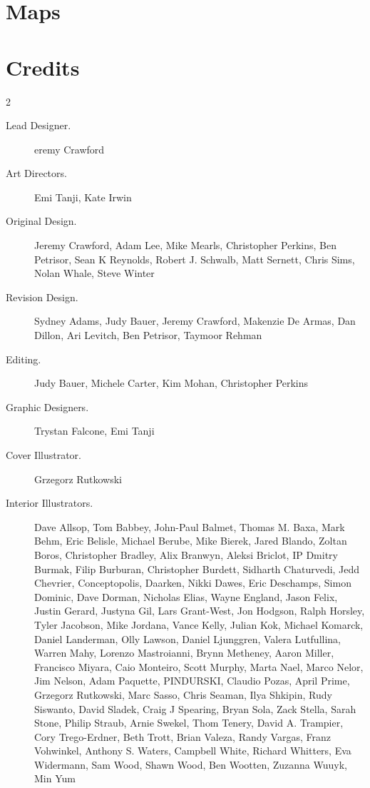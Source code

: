 \documentclass[10pt,a4paper,twoside,bg=print,twocolumn,openany,nodeprecatedcode]{dndbook}
\begin{document}
\chapter{Maps}
\chapter{Credits}

\begin{description}
\begin{multicols}{2}

\begin{description}
\item[Lead Designer.]
eremy Crawford


\item[Art Directors.]
Emi Tanji, Kate Irwin

\item[Original Design.]
Jeremy Crawford, Adam Lee, Mike Mearls, Christopher Perkins, Ben Petrisor, Sean K Reynolds, Robert J. Schwalb, Matt Sernett, Chris Sims, Nolan Whale, Steve Winter

\item[Revision Design.]
Sydney Adams, Judy Bauer, Jeremy Crawford, Makenzie De Armas, Dan Dillon, Ari Levitch, Ben Petrisor, Taymoor Rehman

\item[Editing.]
Judy Bauer, Michele Carter, Kim Mohan, Christopher Perkins

\item[Graphic Designers.]
Trystan Falcone, Emi Tanji

\item[Cover Illustrator.]
Grzegorz Rutkowski

\item[Interior Illustrators.]
Dave Allsop, Tom Babbey, John-Paul Balmet, Thomas M. Baxa, Mark Behm, Eric Belisle, Michael Berube, Mike Bierek, Jared Blando, Zoltan Boros, Christopher Bradley, Alix Branwyn, Aleksi Briclot, IP Dmitry Burmak, Filip Burburan, Christopher Burdett, Sidharth Chaturvedi, Jedd Chevrier, Conceptopolis, Daarken, Nikki Dawes, Eric Deschamps, Simon Dominic, Dave Dorman, Nicholas Elias, Wayne England, Jason Felix, Justin Gerard, Justyna Gil, Lars Grant-West, Jon Hodgson, Ralph Horsley, Tyler Jacobson, Mike Jordana, Vance Kelly, Julian Kok, Michael Komarck, Daniel Landerman, Olly Lawson, Daniel Ljunggren, Valera Lutfullina, Warren Mahy, Lorenzo Mastroianni, Brynn Metheney, Aaron Miller, Francisco Miyara, Caio Monteiro, Scott Murphy, Marta Nael, Marco Nelor, Jim Nelson, Adam Paquette, PINDURSKI, Claudio Pozas, April Prime, Grzegorz Rutkowski, Marc Sasso, Chris Seaman, Ilya Shkipin, Rudy Siswanto, David Sladek, Craig J Spearing, Bryan Sola, Zack Stella, Sarah Stone, Philip Straub, Arnie Swekel, Thom Tenery, David A. Trampier, Cory Trego-Erdner, Beth Trott, Brian Valeza, Randy Vargas, Franz Vohwinkel, Anthony S. Waters, Campbell White, Richard Whitters, Eva Widermann, Sam Wood, Shawn Wood, Ben Wootten, Zuzanna Wuuyk, Min Yum


\end{description}
\end{multicols}
\end{description}
\end{document}
